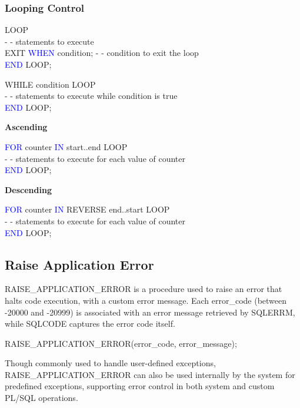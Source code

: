 \subsubsection{Looping Control}
\begin{tcolorbox}[title = Simple Loop] 

LOOP\\
    \textcolor{commentgray}{- - statements to execute}\\
    EXIT \textcolor{blue}{WHEN} condition; \textcolor{commentgray}{- - condition to exit the loop}\\
\textcolor{blue}{END} LOOP;
\end{tcolorbox}
\begin{tcolorbox}[title = While Loop]
WHILE condition LOOP\\
\textcolor{commentgray}{- - statements to execute while condition is true}\\
\textcolor{blue}{END} LOOP;
\end{tcolorbox}
\begin{tcolorbox}[title = For Loop]
 \textbf{Ascending}

\vspace{0.15cm}
\textcolor{blue}{FOR} counter \textcolor{blue}{IN} start..end LOOP\\
\textcolor {commentgray}{- - statements to execute for each value of counter}\\
\textcolor{blue}{END} LOOP;

\vspace{0.25cm}
 \textbf{Descending}

 \vspace{0.15cm} 
\textcolor{blue}{FOR} counter \textcolor{blue}{IN} REVERSE end..start LOOP\\
\textcolor {commentgray}{- - statements to execute for each value of counter}\\
\textcolor{blue}{END} LOOP;

\end{tcolorbox}
\subsection{Raise Application Error}
\begin{tcolorbox}[title = Raise Errors] 
RAISE\_APPLICATION\_ERROR is a procedure used to raise an error that halts code execution, with a custom error
message. Each error\_code (between -20000 and -20999) is associated with an error message retrieved 
by SQLERRM, while SQLCODE captures the error code itself.

\begin{center}
RAISE\_APPLICATION\_ERROR(error\_code, error\_message);
\end{center}

Though commonly used to handle user-defined exceptions, RAISE\_APPLICATION\_ERROR can also be used internally
by the system for predefined exceptions, supporting error control in both system and custom PL/SQL operations.
\end{tcolorbox}


